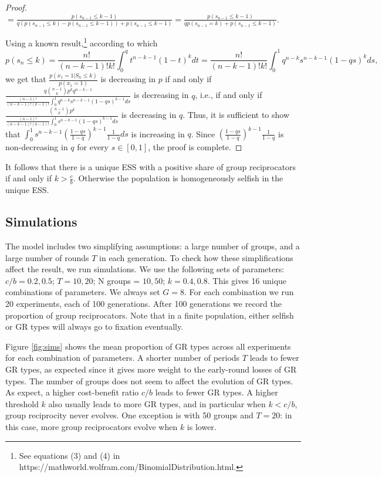 \documentclass[12pt,a4paper]{article}
\begin{document}
\begin{proof}
\vspace{0.3cm}
$=\frac{p(s_{n-1} \leq k-1)}{q(p(s_{n-1} \leq k)-p(s_{n-1} \leq k-1))+p(s_{n-1} \leq k-1)}=\frac{p(s_{n-1} \leq k-1)}{qp(s_{n-1}=k)+p(s_{n-1} \leq k-1)}.$
\vspace{0.3cm}

Using a known result,\footnote{See equations (3) and (4) in https://mathworld.wolfram.com/BinomialDistribution.html.} according to which
\begin{equation*}
    p(s_n \leq k) = \frac{n!}{(n-k-1)!k!}\int_0^q t^{n-k-1}(1-t)^k dt = \frac{n!}{(n-k-1)!k!}\int_0^1 q^{n-k} s^{n-k-1} (1-qs)^k ds,
\end{equation*}
we get that $\frac{p(x_1=1|S_n \leq k)}{p(x_1=1)}$ is decreasing in $p$ if and only if $\frac{q \binom{n-1}{k} p^k q^{n-k-1}}{\frac{(n-1)!}{(n-k-1)!(k-1)!}\int_0^1 q^{n-k}s^{n-k-1}(1-qs)^{k-1} ds}$ is decreasing in $q$, i.e., if and only if $\frac{\binom{n-1}{k} p^k}{\frac{(n-1)!}{(n-k-1)!(k-1)!}\int_0^1 s^{n-k-1}(1-qs)^{k-1} ds}$ is decreasing in $q$.
\vspace{0.3cm}
Thus, it is sufficient to show that $\int_0^1 s^{n-k-1}(\frac{1-qs}{1-q})^{k-1}\frac{1}{1-q} ds$ is increasing in $q$. Since $(\frac{1-qs}{1-q})^{k-1}\frac{1}{1-q}$ is non-decreasing in $q$ for every $s \in [0,1]$, the proof is complete.

\end{proof}
%
It follows that there is a unique ESS with a positive share of group
reciprocators if and only if $k > \frac{c}{b}$. Otherwise the population is homogeneously selfish in the unique ESS.

\subsection{Simulations}

The model includes two simplifying assumptions: a large number of groups, and a large
number of rounds $T$ in each generation. To check how these simplifications affect
the result, we run simulations. We use the following sets of parameters:
$c/b = 0.2, 0.5$; $T = 10, 20$; N groups = $10, 50$; $k = 0.4, 0.8$. This gives
16 unique combinations of parameters. We always set $G = 8$.
For each combination we run 20 experiments, each of 100 generations. After
100 generations we record the proportion of group reciprocators. Note that
in a finite population, either selfish or GR types will always go to fixation
eventually. 

Figure \ref{fig:sims} shows the mean proportion of GR types across all experiments for
each combination of parameters. A shorter number of periods $T$ leads to fewer 
GR types, as expected since it gives more weight to the early-round losses of GR 
types. The number of groups does not seem to affect the evolution of GR types. As
expect, a higher cost-benefit ratio $c/b$ leads to fewer GR types. A higher threshold $k$
also usually leads to more GR types, and in particular when $k < c/b$, group reciprocity
never evolves. One exception is with 50 groups and $T = 20$: in this case,
more group reciprocators evolve when $k$ is lower.
\end{document}
